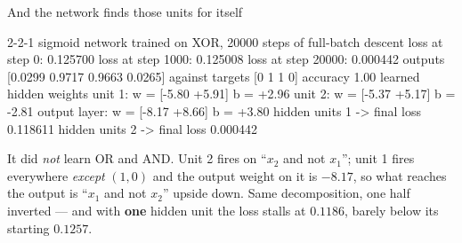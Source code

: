 \documentclass[aspectratio=169]{beamer}
\begin{document}
\begin{frame}[fragile,shrink=8]{And the network finds those units for itself}
\begin{outblk}
2-2-1 sigmoid network trained on XOR, 20000 steps of full-batch descent
   loss at step     0: 0.125700
   loss at step  1000: 0.125008
   loss at step 20000: 0.000442
   outputs [0.0299 0.9717 0.9663 0.0265] against targets [0 1 1 0]
   accuracy 1.00
   learned hidden weights
      unit 1: w = [-5.80 +5.91]  b = +2.96
      unit 2: w = [-5.37 +5.17]  b = -2.81
   output layer: w = [-8.17 +8.66]  b = +3.80
   hidden units 1 -> final loss 0.118611
   hidden units 2 -> final loss 0.000442
\end{outblk}
  \begin{center}\small
    It did \emph{not} learn OR and AND. Unit 2 fires on
    ``$x_2$ and not $x_1$''; unit 1 fires everywhere \emph{except} $(1,0)$
    and the output weight on it is $-8.17$, so what reaches the output is
    ``$x_1$ and not $x_2$'' upside down. Same decomposition, one half
    inverted --- and with \textbf{one} hidden unit the loss stalls at
    $0.1186$, barely below its starting $0.1257$.
  \end{center}
\end{frame}
\end{document}
